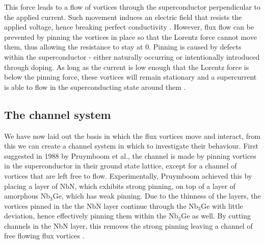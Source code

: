 \documentclass{article}
\numberwithin{equation}{section}
\begin{document}
This force leads to a flow of vortices through the superconductor perpendicular to the applied current. Such movement induces an electric field that resists the applied voltage, hence breaking perfect conductivity \cite{Tinkham2004IntroductionSuperconductivity}. However, flux flow can be prevented by pinning the vortices in place so that the Lorentz force cannot move them, thus allowing the resistance to stay at 0. Pinning is caused by defects within the superconductor - either naturally occurring or intentionally introduced through doping. As long as the current is low enough that the Lorentz force is below the pinning force, these vortices will remain stationary and a supercurrent is able to flow in the superconducting state around them \cite{Poole2014Superconductivity}.

\subsection{The channel system}
We have now laid out the basis in which the flux vortices move and interact, from this we can create a channel system in which to investigate their behaviour.
First suggested in 1988 by Pruymboom et al., the channel is made by pinning vortices in the superconductor in their ground state lattice, except for a channel of vortices that are left free to flow. Experimentally, Pruymboom achieved this by placing a layer of NbN, which exhibits strong pinning, on top of a layer of amorphous Nb$_3$Ge, which has weak pinning. Due to the thinness of the layers, the vortices pinned in the the NbN layer continue through the Nb$_3$Ge with little deviation, hence effectively pinning them within the Nb$_3$Ge as well. By cutting channels in the NbN layer, this removes the strong pinning leaving a channel of free flowing flux vortices \cite{Pruymboom1988Flux-lineFilms}.
\end{document}
